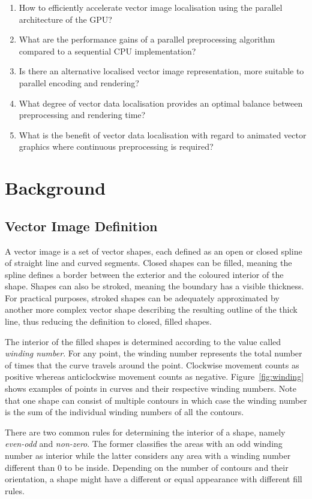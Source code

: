 \documentclass[11pt,a4paper,twoside]{article}
\begin{document}
\begin {enumerate}
\item
How to efficiently accelerate vector image localisation using the parallel architecture of the GPU?
\item
What are the performance gains of a parallel preprocessing algorithm compared to a sequential CPU implementation?
\item
Is there an alternative localised vector image representation, more suitable to parallel encoding and rendering?
\item
What degree of vector data localisation provides an optimal balance between preprocessing and rendering time?
\item
What is the benefit of vector data localisation with regard to animated vector graphics where continuous preprocessing is required?
\end {enumerate}

\section {Background}
\subsection {Vector Image Definition}

A vector image is a set of vector shapes, each defined as an open or closed spline of straight line and curved segments. Closed shapes can be filled, meaning the spline defines a border between the exterior and the coloured interior of the shape. Shapes can also be stroked, meaning the boundary has a visible thickness. For practical purposes, stroked shapes can be adequately approximated by another more complex vector shape describing the resulting outline of the thick line, thus reducing the definition to closed, filled shapes.

The interior of the filled shapes is determined according to the value called \emph{winding number}. For any point, the winding number represents the total number of times that the curve travels around the point. Clockwise movement counts as positive whereas anticlockwise movement counts as negative. Figure~\ref{fig:winding} shows examples of points in curves and their respective winding numbers. Note that one shape can consist of multiple contours in which case the winding number is the sum of the individual winding numbers of all the contours.

There are two common rules for determining the interior of a shape, namely \emph{even-odd} and \emph{non-zero}. The former classifies the areas with an odd winding number as interior while the latter considers any area with a winding number different than $0$ to be inside. Depending on the number of contours and their orientation, a shape might have a different or equal appearance with different fill rules.
\end{document}
